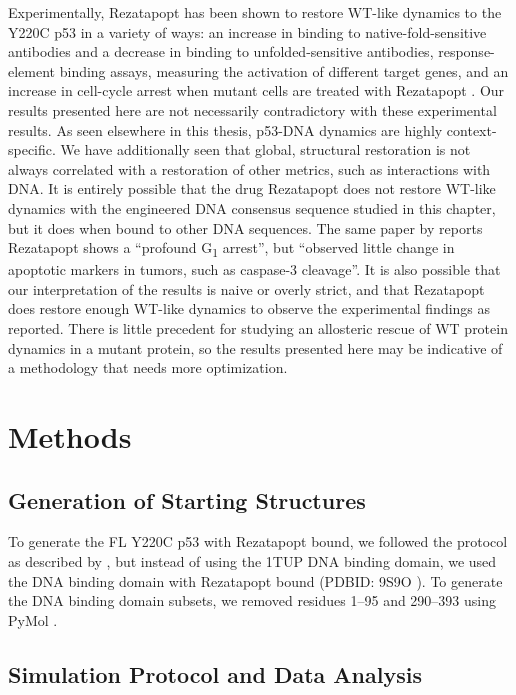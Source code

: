 Experimentally, Rezatapopt has been shown to restore WT-like dynamics to the Y220C p53 in a variety of ways: an increase in binding to native-fold-sensitive antibodies and a decrease in binding to unfolded-sensitive antibodies, response-element binding assays, measuring the activation of different target genes, and an increase in cell-cycle arrest when mutant cells are treated with Rezatapopt \parencite{puzio-kuterRestorationTumorSuppressor2025}. Our results presented here are not necessarily contradictory with these experimental results. As seen elsewhere in this thesis, p53-DNA dynamics are highly context-specific. We have additionally seen that global, structural restoration is not always correlated with a restoration of other metrics, such as interactions with DNA. It is entirely possible that the drug Rezatapopt does not restore WT-like dynamics with the engineered DNA consensus sequence studied in this chapter, but it does when bound to other DNA sequences. The same paper by \textcite{puzio-kuterRestorationTumorSuppressor2025} reports Rezatapopt shows a ``profound G\textsubscript{1} arrest'', but ``observed little change in apoptotic markers in tumors, such as caspase-3 cleavage''. It is also possible that our interpretation of the results is naive or overly strict, and that Rezatapopt does restore enough WT-like dynamics to observe the experimental findings as reported. There is little precedent for studying an allosteric rescue of WT protein dynamics in a mutant protein, so the results presented here may be indicative of a methodology that needs more optimization.

\section{Methods}

\subsection{Generation of Starting Structures}

To generate the FL Y220C p53 with Rezatapopt bound, we followed the protocol as described by \parencite{stetsonRestorationY220CP532025}, but instead of using the 1TUP DNA binding domain, we used the DNA binding domain with Rezatapopt bound (PDBID: 9S9O \parencite{mavridiTargetingP53Cancer2026}). To generate the DNA binding domain subsets, we removed residues \numrange{1}{95} and \numrange{290}{393} using PyMol \parencite{PyMOL}.

\subsection{Simulation Protocol and Data Analysis}

